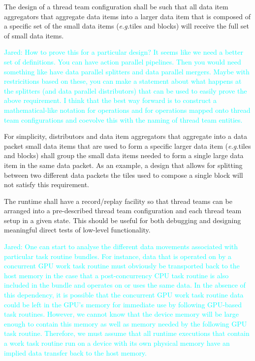 \documentclass{article}
\newcommand{\eg}{\textit{e.g.}}   %
\newcommand{\Jared}[1]          {\textcolor{cyan}{Jared: #1}}
\newcommand{\taskroutine}        {task routine\xspace}
\newcommand{\taskroutines}       {task routines\xspace}
\begin{document}
\begin{req}
The design of a thread team configuration shall be such that all data item
aggregators that aggregate data items into a larger data item that
is composed of a specific set of the small data items (\eg tiles and blocks)
will receive the full set of small data items.
\end{req}

\Jared{How to prove this for a particular design?  It seems like we need a better set of definitions.
You can have action parallel pipelines.  Then you would need something like have data parallel
splitters and data parallel mergers.  Maybe with restricitions based on these,
you can make a statement about what happens at the splitters (and data parallel
distributors) that can be used to easily prove the above requirement.  I think
that the best way forward is to construct a mathematical-like notation for
operations and for operations mapped onto thread team configurations and
coevolve this with the naming of thread team entities.}

\begin{req}
For simplicity, distributors and data item aggregators that aggregate into a
data packet small data items that are used to form a specific larger data item
(\eg tiles and blocks) shall group the small data items needed to form a single
large data item in the same data packet.  As an example, a design that allows
for splitting between two different data packets the tiles used to compose a
single block will not satisfy this requirement.
\end{req}

\begin{req}
The runtime shall have a record/replay facility so that thread teams can be
arranged into a pre-described thread team configuration and each thread team setup in a given
state.  This should be useful for both debugging and designing meaningful direct
tests of low-level functionality.
\end{req}

\Jared{One can start to analyse the different data movements associated with particular
\taskroutine bundles.  For instance, data that is operated on by a concurrent GPU work
\taskroutine must obviously be transported back to the host memory in the case that a
post-concurrency CPU \taskroutine is also included in the bundle and operates on or uses
the same data.  In the absence of this dependency, it is possible that the
concurrent GPU work \taskroutine data could be left in the GPU's memory for immediate
use by following GPU-based \taskroutines.  However, we cannot know that the device
memory will be large enough to contain this memory as well as memory needed by
the following GPU \taskroutine.  Therefore, we must assume that all runtime executions
that contain a work \taskroutine run on a device with its own physical memory have an
implied data transfer back to the host memory.}\\
\end{document}
